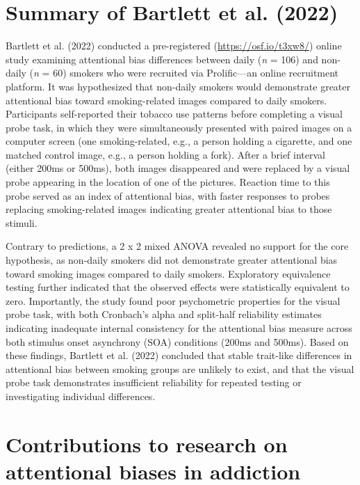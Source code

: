 \documentclass[authordate, empirical]{jote-new-article}
\begin{document}
	\section{Summary of Bartlett et al. (2022)}



	Bartlett et al. (2022) conducted a pre-registered (\url{https://osf.io/t3xw8/}) online study examining attentional bias differences between daily (\emph{n} = 106) and non-daily (\emph{n} = 60) smokers who were recruited via Prolific—an online recruitment platform. It was hypothesized that non-daily smokers would demonstrate greater attentional bias toward smoking-related images compared to daily smokers. Participants self-reported their tobacco use patterns before completing a visual probe task, in which they were simultaneously presented with paired images on a computer screen (one smoking-related, e.g., a person holding a cigarette, and one matched control image, e.g., a person holding a fork). After a brief interval (either 200ms or 500ms), both images disappeared and were replaced by a visual probe appearing in the location of one of the pictures. Reaction time to this probe served as an index of attentional bias, with faster responses to probes replacing smoking-related images indicating greater attentional bias to those stimuli.



	Contrary to predictions, a 2 x 2 mixed ANOVA revealed no support for the core hypothesis, as non-daily smokers did not demonstrate greater attentional bias toward smoking images compared to daily smokers. Exploratory equivalence testing further indicated that the observed effects were statistically equivalent to zero. Importantly, the study found poor psychometric properties for the visual probe task, with both Cronbach's alpha and split-half reliability estimates indicating inadequate internal consistency for the attentional bias measure across both stimulus onset asynchrony (SOA) conditions (200ms and 500ms). Based on these findings, Bartlett et al. (2022) concluded that stable trait-like differences in attentional bias between smoking groups are unlikely to exist, and that the visual probe task demonstrates insufficient reliability for repeated testing or investigating individual differences.



	\section{Contributions to research on attentional biases in addiction}
\end{document}
